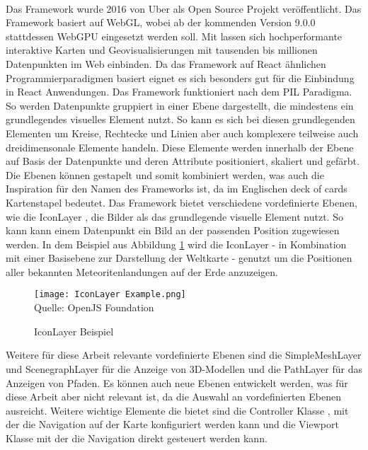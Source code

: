 \paragraph{\deckgl{}}
Das Framework \deckgl{} wurde 2016 von Uber als Open Source Projekt veröffentlicht\cite{Visgl}. Das Framework basiert auf \ac{WebGL}, wobei ab der kommenden Version 9.0.0 stattdessen WebGPU eingesetzt werden soll\cite{Green2022}. Mit \deckgl lassen sich hochperformante interaktive Karten und Geovisualisierungen mit tausenden bis millionen Datenpunkten im Web einbinden. Da das Framework auf React ähnlichen Programmierparadigmen basiert eignet es sich besonders gut für die Einbindung in React Anwendungen. Das Framework funktioniert nach dem \ac{PIL} Paradigma. So werden Datenpunkte gruppiert in einer Ebene dargestellt, die mindestens ein grundlegendes visuelles Element nutzt. So kann es sich bei diesen grundlegenden Elementen um Kreise, Rechtecke und Linien aber auch komplexere teilweise auch dreidimensonale Elemente handeln. Diese Elemente werden innerhalb der Ebene auf Basis der Datenpunkte und deren Attribute positioniert, skaliert und gefärbt. Die Ebenen können gestapelt und somit kombiniert werden, was auch die Inspiration für den Namen des Frameworks ist, da im Englischen deck of cards Kartenstapel bedeutet.\cite[S.~2]{YangWang2019} Das Framework bietet verschiedene vordefinierte Ebenen, wie die IconLayer \cite{DeckglIconLayer}, die Bilder als das grundlegende visuelle Element nutzt. So kann kann einem Datenpunkt ein Bild an der passenden Position zugewiesen werden. In dem Beispiel aus Abbildung \ref{fig:IconLayerExample} wird die IconLayer - in Kombination mit einer Basisebene zur Darstellung der Weltkarte - genutzt um die Positionen aller bekannten Meteoritenlandungen auf der Erde anzuzeigen.

\begin{figure}[H]
    \caption{IconLayer Beispiel}\label{fig:IconLayerExample}
    \texttt{[image: IconLayer Example.png]}
    \\
    Quelle: OpenJS Foundation \cite{DeckGlMeteorites}
\end{figure}

Weitere für diese Arbeit relevante vordefinierte Ebenen sind die SimpleMeshLayer \cite{DeckglSimpleMeshLayer} und ScenegraphLayer \cite{DeckglScenegraphLayer} für die Anzeige von 3D-Modellen und die PathLayer für das Anzeigen von Pfaden. Es können auch neue Ebenen entwickelt werden, was für diese Arbeit aber nicht relevant ist, da die Auswahl an vordefinierten Ebenen ausreicht. Weitere wichtige Elemente die \deckgl{} bietet sind die Controller Klasse \cite{DeckglController}, mit der die Navigation auf der Karte konfiguriert werden kann und die Viewport Klasse \cite{DeckglViewport} mit der die Navigation direkt gesteuert werden kann.

